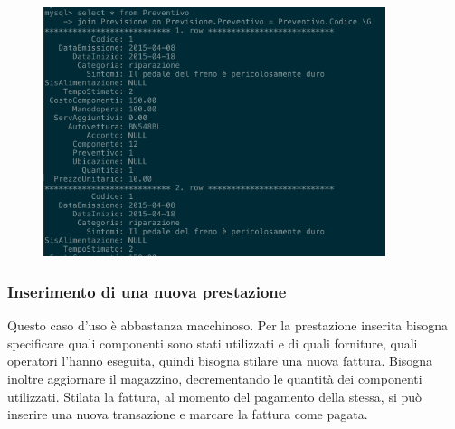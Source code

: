         \begin{figure}[H]
          \centering
          \includegraphics[width=10cm]{images/screenshots/nuovo_preventivo_2.png}
        \end{figure}


      \subsubsection{Inserimento di una nuova prestazione}
        Questo caso d'uso è abbastanza macchinoso. Per la prestazione inserita bisogna specificare quali componenti sono stati utilizzati e di quali forniture, quali operatori l'hanno eseguita, quindi bisogna stilare una nuova fattura. Bisogna inoltre aggiornare il magazzino, decrementando le quantità dei componenti utilizzati.
        Stilata la fattura, al momento del pagamento della stessa, si può inserire una nuova transazione e marcare la fattura come pagata.

